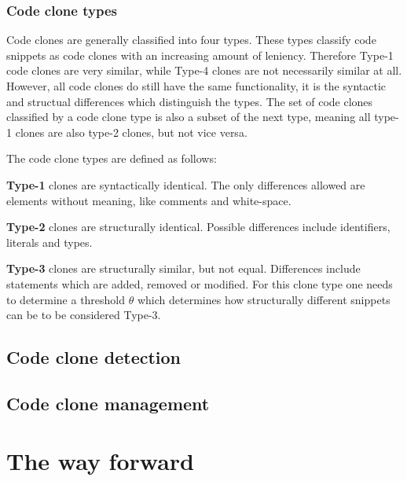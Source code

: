 \documentclass[12pt]{article}
\begin{document}
\subsubsection{Code clone types}

Code clones are generally classified into four types.\cite{Inoue_introduction_to_cc} These
types classify code snippets as code clones with an increasing amount of leniency.
Therefore Type-1 code clones are very similar, while Type-4 clones are not necessarily
similar at all. However, all code clones do still have the same functionality, it is the
syntactic and structual differences which distinguish the types. The set of code clones
classified by a code clone type is also a subset of the next type, meaning all type-1
clones are also type-2 clones, but not vice versa.

The code clone types are defined as follows:

\textbf{Type-1} clones are syntactically identical. The only differences allowed are elements
without meaning, like comments and white-space. 

\textbf{Type-2} clones are structurally identical. Possible differences include
identifiers, literals and types. 

\textbf{Type-3} clones are structurally similar, but not equal. Differences include
statements which are added, removed or modified. For this clone type one needs to
determine a threshold $\theta$ which determines how structurally different snippets can be
to be considered Type-3\cite{Inoue_introduction_to_cc}.

\subsection{Code clone detection}

\subsection{Code clone management}

\section{The way forward}



\end{document}
